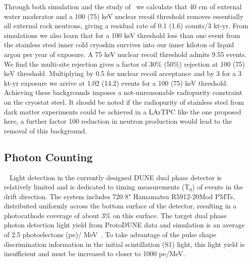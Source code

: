 \documentclass[a4paper,11pt]{article}
\begin{document}
Through both simulation and the study of~\cite{beacom_bkd} we calculate that 40 cm of external water moderator and a 100 (75) keV nuclear recoil threshold removes essentially all external rock neutrons, giving a residual rate of 0.1 (1.6) counts/3 kt-yr. From simulations we also learn that for a 100 keV threshold less than one event from the stainless steel inner cold cryoskin survives into our inner kiloton of liquid argon per year of exposure. A 75 keV nuclear recoil threshold admits 9.55 events. We find the multi-site rejection gives a factor of 30\% (50\%) rejection at 100 (75) keV threshold. Multiplying by 0.5 for nuclear recoil acceptance and by 3 for a 3 kt-yr exposure we arrive at 1.02 (14.2) events for a 100 (75) keV threshold. Achieving these backgrounds imposes a not-unreasonable radiopurity constraint on the cryostat steel. It should be noted if the radiopurity of stainless steel from dark matter experiments could be achieved in a LArTPC like the one proposed here, a further factor 100 reduction in neutron production would lead to the removal of this background.

\subsection{Photon Counting}~\label{photoncount}
Light detection in the currently designed DUNE dual phase detector is relatively limited and is dedicated to timing measurements (T$_0$) of 
events in the drift direction. The system includes 720 8" Hamamatsu R5912-20Mod PMTs, distributed uniformly across the bottom surface of the detector, resulting in a photocathode coverage of about 3\% on this surface. The target dual phase photon detection light yield from ProtoDUNE data and simulation is an average of 2.5 photoelectons (pe)/ MeV~\cite{TDR}. To take advantage of the pulse shape discrimination information in the initial scintillation (S1) light, this light yield is insufficient and must be increased to closer to 1000 pe/MeV.
\end{document}
